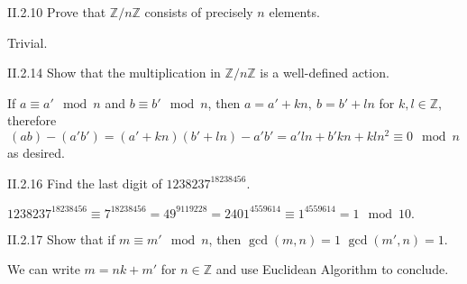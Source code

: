 \begin{problem}{II.2.10}
Prove that $\mathbb{Z}/n\mathbb{Z}$ consists of precisely $n$ elements.
\end{problem}
\begin{pf}
Trivial.
\end{pf}

\begin{problem}{II.2.14}
Show that the multiplication in $\mathbb{Z}/n\mathbb{Z}$ is a well-defined action.
\end{problem}
\begin{pf}
If $a \equiv a' \mod n$ and $b \equiv b' \mod n$, then $a = a' + kn, \: b = b' + ln$ for $k, l \in \mathbb{Z}$, therefore
\[
(ab) - (a'b') = (a' + kn)(b' + ln) - a'b' = a'ln + b'kn + kln^2 \equiv 0 \mod n
\]
as desired.
\end{pf}

\begin{problem}{II.2.16}
Find the last digit of $1238237^{18238456}$.
\end{problem}
\begin{sol}
$
1238237^{18238456} \equiv 7^{18238456} = 49^{9119228} = 2401^{4559614} \equiv 1^{4559614} = 1 \mod 10.
$
\end{sol}

\begin{problem}{II.2.17}
Show that if $m \equiv m' \mod n$, then $\gcd(m, n) = 1$ \iffw $\gcd(m', n) = 1$.
\end{problem}
\begin{pf}
We can write $m = nk + m'$ for $n \in \mathbb{Z}$ and use Euclidean Algorithm to conclude.
\end{pf}

\section{}

